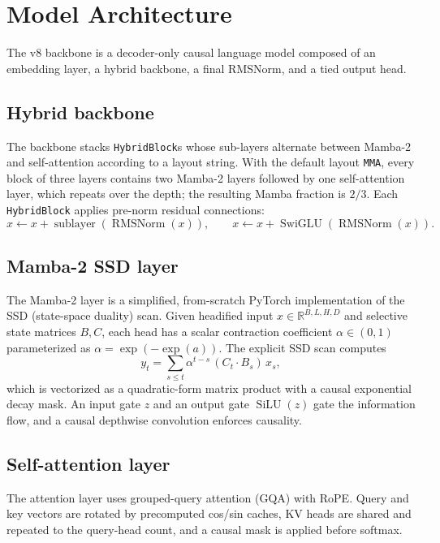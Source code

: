 \documentclass[11pt]{article}
\begin{document}
\section{Model Architecture}
\label{sec:model}

The v8 backbone is a decoder-only causal language model composed of an embedding
layer, a hybrid backbone, a final RMSNorm, and a tied output head.

\subsection{Hybrid backbone}
The backbone stacks \texttt{HybridBlock}s whose sub-layers alternate between
Mamba-2 and self-attention according to a layout string. With the default layout
\texttt{MMA}, every block of three layers contains two Mamba-2 layers followed by
one self-attention layer, which repeats over the depth; the resulting Mamba
fraction is $2/3$. Each \texttt{HybridBlock} applies pre-norm residual
connections:
\begin{equation}
  x \leftarrow x + \operatorname{sublayer}(\operatorname{RMSNorm}(x)),
  \qquad
  x \leftarrow x + \operatorname{SwiGLU}(\operatorname{RMSNorm}(x)).
\end{equation}

\subsection{Mamba-2 SSD layer}
The Mamba-2 layer is a simplified, from-scratch PyTorch implementation of the
SSD (state-space duality) scan. Given headified input $x\in\mathbb{R}^{B,L,H,D}$
and selective state matrices $B,C$, each head has a scalar contraction
coefficient $\alpha\in(0,1)$ parameterized as $\alpha=\exp(-\exp(a))$. The
explicit SSD scan computes
\begin{equation}
  y_t = \sum_{s\le t} \alpha^{t-s}\, (C_t\cdot B_s)\, x_s,
\end{equation}
which is vectorized as a quadratic-form matrix product with a causal exponential
decay mask. An input gate $z$ and an output gate $\operatorname{SiLU}(z)$ gate
the information flow, and a causal depthwise convolution enforces causality.

\subsection{Self-attention layer}
The attention layer uses grouped-query attention (GQA) with RoPE. Query and key
vectors are rotated by precomputed cos/sin caches, KV heads are shared and
repeated to the query-head count, and a causal mask is applied before softmax.
\end{document}
